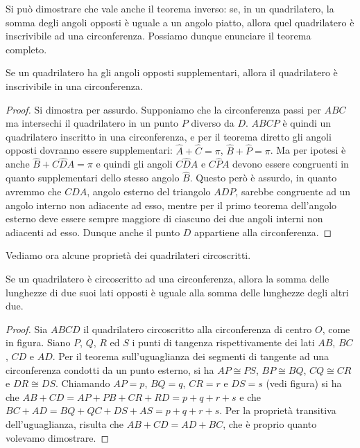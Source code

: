 Si può dimostrare che vale anche il teorema inverso: se, in un quadrilatero, la somma degli angoli opposti è uguale a un angolo piatto, allora quel quadrilatero è inscrivibile ad una circonferenza.
Possiamo dunque enunciare il teorema completo.

\begin{teorema}[inverso]
Se un quadrilatero ha gli angoli opposti supplementari, allora il quadrilatero è inscrivibile in una circonferenza.
\end{teorema}

\begin{proof}
Si dimostra per assurdo. Supponiamo che la circonferenza passi per $ABC$ ma intersechi il quadrilatero in un punto $P$ diverso da $D$. $ABCP$ è quindi un quadrilatero inscritto in una circonferenza, e per il teorema diretto gli angoli opposti dovranno essere supplementari: $\widehat{A}+\widehat{C}=\pi$, $\widehat{B}+\widehat{P}=\pi$. Ma per ipotesi è anche $\widehat{B}+C\widehat{D}A=\pi$ e quindi gli angoli $C\widehat{D}A$ e $C\widehat{P}A$ devono essere congruenti in quanto supplementari dello stesso angolo $\widehat{B}$. Questo però è assurdo, in quanto avremmo che $C\widehat{D}A$, angolo esterno del triangolo $ADP$, sarebbe congruente ad un angolo interno non adiacente ad esso, mentre per il primo teorema dell'angolo esterno deve essere sempre maggiore di ciascuno dei due angoli interni non adiacenti ad esso. Dunque anche il punto $D$ appartiene alla circonferenza.
\end{proof}

Vediamo ora alcune proprietà dei quadrilateri circoscritti.

\begin{teorema}
Se un quadrilatero è circoscritto ad una circonferenza, allora la somma delle lunghezze di due suoi lati opposti è uguale alla somma delle lunghezze degli altri due.
\end{teorema}

\begin{proof}
Sia $ABCD$ il quadrilatero circoscritto alla circonferenza di centro $O$, come in figura. Siano $P$, $Q$, $R$ ed $S$ i punti di tangenza rispettivamente dei lati $AB$, $BC$, $CD$ e $AD$. Per il teorema sull'uguaglianza dei segmenti di tangente ad una circonferenza condotti da un punto esterno, si ha $AP\cong PS$, $BP\cong BQ$, $CQ\cong CR$ e $DR\cong DS$. Chiamando $AP=p$, $BQ=q$, $CR=r$ e $DS=s$ (vedi figura) si ha che $AB+CD = AP+PB+CR+RD = p+q+r+s$ e che $BC+AD = BQ+QC+DS+AS = p+q+r+s$.
Per la proprietà transitiva dell'uguaglianza, risulta che $AB+CD=AD+BC$, che è proprio quanto volevamo dimostrare.
\end{proof}

